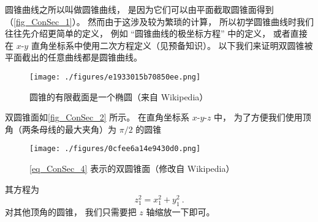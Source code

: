 

圆锥曲线之所以叫做圆锥曲线， 是因为它们可以由平面截取圆锥面得到（\autoref{fig_ConSec_1}）。 然而由于这涉及较为繁琐的计算， 所以初学圆锥曲线时我们往往先介绍更简单的定义， 例如 “圆锥曲线的极坐标方程” 中的定义， 或者直接在 $x$-$y$ 直角坐标系中使用二次方程定义（见预备知识）。 以下我们来证明双圆锥被平面截出的任意曲线都是圆锥曲线。

\begin{figure}[ht]
\centering
\texttt{[image: ./figures/e1933015b70850ee.png]}
\caption{圆锥的有限截面是一个椭圆（来自 Wikipedia）} \label{fig_ConSec_1}
\end{figure}

双圆锥面如\autoref{fig_ConSec_2} 所示。 在直角坐标系 $x$-$y$-$z$ 中， 为了方便我们使用顶角（两条母线的最大夹角）为 $\pi/2$ 的圆锥
\begin{figure}[ht]
\centering
\texttt{[image: ./figures/0cfee6a14e9430d0.png]}
\caption{\autoref{eq_ConSec_4} 表示的双圆锥面（修改自 Wikipedia）} \label{fig_ConSec_2}
\end{figure}
其方程为
\begin{equation}\label{eq_ConSec_4}
z_1^2 = x_1^2 + y_1^2~.
\end{equation}
对其他顶角的圆锥， 我们只需要把 $z$ 轴缩放一下即可。

